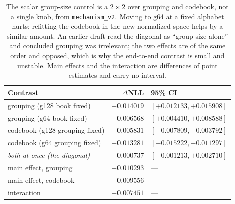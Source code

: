 \begin{table}[t]
\centering
\small
\begin{tabular}{lrl}
\toprule
Contrast & $\Delta$NLL & 95\% CI \\
\midrule
grouping (g128 book fixed) & $+0.014019$ & $[+0.012133, +0.015908]$ \\
grouping (g64 book fixed) & $+0.006568$ & $[+0.004410, +0.008588]$ \\
codebook (g128 grouping fixed) & $-0.005831$ & $[-0.007809, -0.003792]$ \\
codebook (g64 grouping fixed) & $-0.013281$ & $[-0.015222, -0.011297]$ \\
\emph{both at once (the diagonal)} & $+0.000737$ & $[-0.001213, +0.002710]$ \\
\midrule
main effect, grouping & $+0.010293$ & --- \\
main effect, codebook & $-0.009556$ & --- \\
interaction & $+0.007451$ & --- \\
\bottomrule
\end{tabular}
\caption{The scalar group-size control is a $2\times2$ over grouping and codebook, not a single knob, from \texttt{mechanism\_v2}. Moving to g64 at a fixed alphabet hurts; refitting the codebook in the new normalized space helps by a similar amount. An earlier draft read the diagonal as ``group size alone'' and concluded grouping was irrelevant; the two effects are of the same order and opposed, which is why the end-to-end contrast is small and unstable. Main effects and the interaction are differences of point estimates and carry no interval.}
\label{tab:g64}
\end{table}
